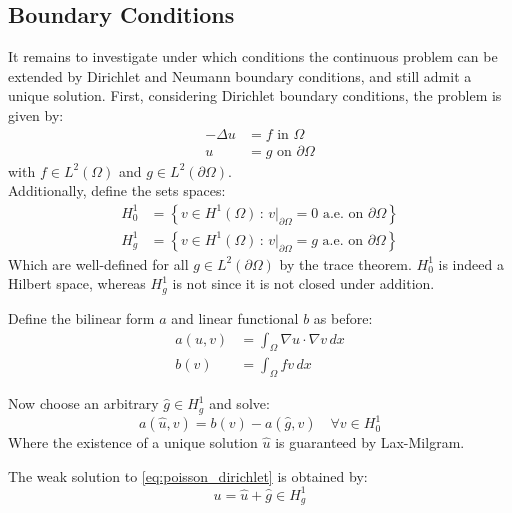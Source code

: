 \documentclass[11pt,a4paper]{article}
\begin{document}
\subsection*{Boundary Conditions}
It remains to investigate under which conditions the continuous problem can be
extended by Dirichlet and Neumann boundary conditions, and still admit a unique
solution. First, considering Dirichlet boundary conditions, the problem is given by:
\begin{equation} \label{eq:poisson_dirichlet}
  \begin{split}
    -\Delta u &= f  \text{ in } \Omega\\
    u &= g \text{ on } \partial\Omega
  \end{split}
\end{equation}
with $f \in L^2(\Omega)$ and $g \in L^2(\partial\Omega)$.\\
Additionally, define the sets spaces:
\begin{equation*}
  \begin{split}
    H^1_0 &= \left\{ v \in H^1(\Omega)\, :\, v\vert_{\partial\Omega} = 0 \text{ a.e. on } \partial\Omega\right\}\\
    H^1_g &= \left\{ v \in H^1(\Omega)\, :\, v\vert_{\partial\Omega} = g \text{ a.e. on } \partial\Omega\right\}
  \end{split}
\end{equation*}
Which are well-defined for all $g \in L^2(\partial\Omega)$ by the trace
theorem. $H^1_0$ is indeed a Hilbert space, whereas $H^1_g$ is not since it is
not closed under addition.

Define the bilinear form $a$ and linear functional $b$ as before:
\begin{equation*}
  \begin{split}
    a(u,v) &= \int_\Omega \nabla u \cdot \nabla v \,dx\\
    b(v)   &= \int_\Omega fv\,dx
  \end{split}
\end{equation*}

Now choose an arbitrary $\hat{g}\in H^1_g$ and solve:
\begin{equation*}
  a(\hat{u},v) = b(v) - a(\hat{g},v) \quad \forall v \in H^1_0
\end{equation*}
Where the existence of a unique solution $\hat{u}$ is guaranteed by Lax-Milgram.

The weak solution to \ref{eq:poisson_dirichlet} is obtained by:
$$u = \hat{u} + \hat{g} \in H^1_g$$
\end{document}
